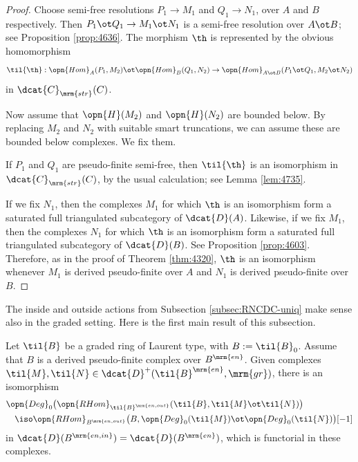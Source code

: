 \begin{proof}
Choose semi-free resolutions $P_1 \to M_1$ and $Q_1 \to N_1$, over $A$ and $B$ 
respectively. Then 
$P_1 \ot Q_1 \to M_1 \ot N_1$
is a semi-free resolution over $A\ot B$; see Proposition \ref{prop:4636}.
The morphism $\th$ is represented by the obvious homomorphism 
\[ \til{\th} : \opn{Hom}_{A}(P_1, M_2) \ot \opn{Hom}_{B}(Q_1, N_2) \to 
\opn{Hom}_{A \ot B}(P_1 \ot Q_1, M_2 \ot N_2) \]
in $\dcat{C}_{\mrm{str}}(C)$. 

Now assume that $\opn{H}(M_2)$ and $\opn{H}(N_2)$ are bounded below. By 
replacing  $M_2$ and $N_2$ with suitable smart truncations, we can assume these
are bounded below complexes. We fix them.

If $P_1$ and $Q_1$ are pseudo-finite semi-free, then $\til{\th}$ is an 
isomorphism in $\dcat{C}_{\mrm{str}}(C)$, by the usual calculation; 
see Lemma \ref{lem:4735}. 

If we fix $N_1$, then the complexes $M_1$ for which $\th$ is an isomorphism 
form a saturated full triangulated subcategory of $\dcat{D}(A)$. 
Likewise, if we fix $M_1$, then the complexes $N_1$ for which $\th$ is an 
isomorphism form a saturated full triangulated subcategory of 
$\dcat{D}(B)$. See Proposition \ref{prop:4603}. 
Therefore, as in the proof of Theorem \ref{thm:4320},
$\th$ is an isomorphism whenever $M_1$ is derived pseudo-finite over $A$ and 
$N_1$ is derived pseudo-finite over $B$.
\end{proof}

The inside and outside actions from Subsection \ref{subsec:RNCDC-uniq} make 
sense also in the graded setting. 
Here is the first main result of this subsection. 

\begin{thm} \label{thm:4510} 
Let $\til{B}$ be a graded ring of Laurent type, with $B := \til{B}_0$.
Assume that $B$ is a derived pseudo-finite complex over $B^{\mrm{en}}$. 
Given complexes 
$\til{M}, \til{N} \in \dcat{D}^{+}(\til{B}^{\mrm{en}},  \mrm{gr})$,
there is an isomorphism 
\[ \begin{aligned}
&
\opn{Deg}_0 \bigl( \opn{RHom}_{\til{B}^{\mrm{en, out}}}
(\til{B}, \til{M} \ot \til{N}) \bigr) 
\\ & \quad 
\iso \opn{RHom}_{B^{\mrm{en, out}}} \bigl( B, 
\opn{Deg}_0(\til{M}) \ot \opn{Deg}_0(\til{N}) \bigr)[-1]
\end{aligned} \]
in $\dcat{D}(B^{\mrm{en, in}}) = \dcat{D}(B^{\mrm{en}})$, 
which is functorial in these complexes.
\end{thm}

